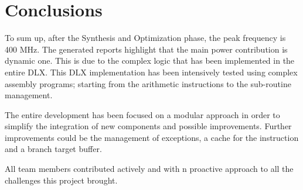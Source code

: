 \chapter{Conclusions}
To sum up, after the Synthesis and Optimization phase, the peak frequency is 400 MHz. The generated reports highlight that the main power contribution is dynamic one. This is due to the complex logic that has been implemented in the entire DLX. This DLX implementation has been intensively tested using complex assembly programs; starting from the arithmetic instructions to the sub-routine management.

The entire development has been focused on a modular approach in order to simplify the integration of new components and possible improvements. Further improvements could be the management of exceptions, a cache for the instruction and a branch target buffer.

All team members contributed actively and with n proactive approach to all the challenges this project brought. 
